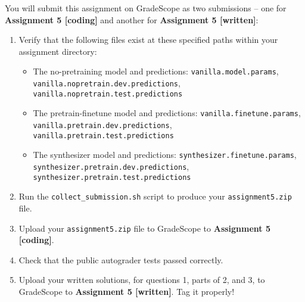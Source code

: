 \documentclass[answers]{exam}
\begin{document}
    \normalsize
    You will submit this assignment on GradeScope as two submissions -- one for \textbf{Assignment 5 [coding]} and another for \textbf{Assignment 5 [written]}:
    \begin{enumerate}
        \item Verify that the following files exist at these specified paths within your assignment directory:
        \begin{itemize}
            \item The no-pretraining model and predictions: \texttt{vanilla.model.params}, \texttt{vanilla.nopretrain.dev.predictions},\\\texttt{vanilla.nopretrain.test.predictions}
            \item The pretrain-finetune model and predictions: \texttt{vanilla.finetune.params}, \texttt{vanilla.pretrain.dev.predictions}, \\ \texttt{vanilla.pretrain.test.predictions}
            \item The synthesizer model and predictions: \texttt{synthesizer.finetune.params}, \texttt{synthesizer.pretrain.dev.predictions}, \\ \texttt{synthesizer.pretrain.test.predictions}
        \end{itemize}

        \item Run the \texttt{collect\_submission.sh} script to produce your \texttt{assignment5.zip} file.
        \item Upload your \texttt{assignment5.zip} file to GradeScope to \textbf{Assignment 5 [coding]}.
        \item Check that the public autograder tests passed correctly.
        \item Upload your written solutions, for questions 1, parts of 2, and 3, to GradeScope to \textbf{Assignment 5 [written]}. Tag it properly!
    \end{enumerate}

    
    
\end{document}
